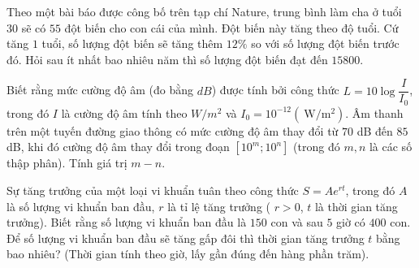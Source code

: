 \begin{ex}%
	Theo một bài báo được công bố trên tạp chí Nature, trung bình làm cha ở tuổi $30$ sẽ có $55$ đột biến cho con cái của mình. Đột biến  này tăng theo độ tuổi. Cứ tăng $1$ tuổi, số lượng đột biến sẽ tăng thêm $12 \%$ so với số lượng đột biến trước đó. Hỏi sau ít nhất bao nhiêu năm thì số lượng đột biến đạt đến $15800$.
\end{ex}

\begin{ex}%
	Biết rằng mức cường độ âm (đo bằng $d B$) được tính bởi công thức $L=10 \log \dfrac{I}{I_0}$, trong đó $I$ là cường độ âm tính theo $W / m^2$ và $I_0=10^{-12}\left(\mathrm{~W} / \mathrm{m}^2\right)$. Âm thanh trên một tuyến đường giao thông có mức cường độ âm thay đổi từ  $70$ dB đến $85$ dB, khi đó cường độ âm thay đổi trong đoạn $\left[10^m; 10^n\right]$ (trong đó $m, n$ là các số thập phân). Tính giá trị $m-n$.
\end{ex}

\begin{ex}%
	Sự tăng trưởng của một loại vi khuẩn tuân theo công thức $S=A e^{r t}$, trong đó $A$ là số lượng vi khuẩn ban đầu, $r$ là tỉ lệ tăng trưởng ( $r>0$, $t$ là thời gian tăng trưởng). Biết rằng số lượng vi khuẩn ban đầu là $150$ con và sau $5$ giờ  có $400$ con. Để số lượng vi khuẩn ban đầu sẽ tăng gấp đôi thì thời gian tăng trưởng $t$ bằng bao nhiêu? (Thời gian tính theo giờ, lấy gần đúng đến hàng phần trăm).
\end{ex}

